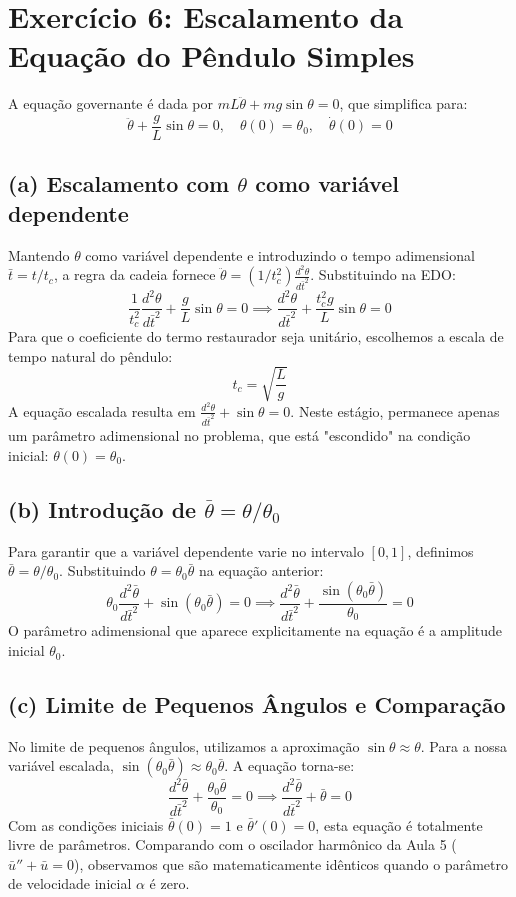 \documentclass{article}
\begin{document}
\section*{Exercício 6: Escalamento da Equação do Pêndulo Simples}

A equação governante é dada por $mL\ddot{\theta} + mg\sin\theta = 0$, que simplifica para:
\[ \ddot{\theta} + \frac{g}{L}\sin\theta = 0, \quad \theta(0) = \theta_0, \quad \dot{\theta}(0) = 0 \]

\subsection*{(a) Escalamento com $\theta$ como variável dependente}
Mantendo $\theta$ como variável dependente e introduzindo o tempo adimensional $\bar{t} = t/t_c$, a regra da cadeia fornece $\ddot{\theta} = (1/t_c^2)\frac{d^2\theta}{d\bar{t}^2}$. Substituindo na EDO:
\[ \frac{1}{t_c^2}\frac{d^2\theta}{d\bar{t}^2} + \frac{g}{L}\sin\theta = 0 \implies \frac{d^2\theta}{d\bar{t}^2} + \frac{t_c^2 g}{L}\sin\theta = 0 \]
Para que o coeficiente do termo restaurador seja unitário, escolhemos a escala de tempo natural do pêndulo:
\[ t_c = \sqrt{\frac{L}{g}} \]
A equação escalada resulta em $\frac{d^2\theta}{d\bar{t}^2} + \sin\theta = 0$. Neste estágio, permanece apenas um parâmetro adimensional no problema, que está "escondido" na condição inicial: $\theta(0) = \theta_0$.

\subsection*{(b) Introdução de $\bar{\theta} = \theta/\theta_0$}
Para garantir que a variável dependente varie no intervalo $[0, 1]$, definimos $\bar{\theta} = \theta/\theta_0$. Substituindo $\theta = \theta_0\bar{\theta}$ na equação anterior:
\[ \theta_0\frac{d^2\bar{\theta}}{d\bar{t}^2} + \sin(\theta_0\bar{\theta}) = 0 \implies \frac{d^2\bar{\theta}}{d\bar{t}^2} + \frac{\sin(\theta_0\bar{\theta})}{\theta_0} = 0 \]
O parâmetro adimensional que aparece explicitamente na equação é a amplitude inicial $\theta_0$.

\subsection*{(c) Limite de Pequenos Ângulos e Comparação}
No limite de pequenos ângulos, utilizamos a aproximação $\sin\theta \approx \theta$. Para a nossa variável escalada, $\sin(\theta_0\bar{\theta}) \approx \theta_0\bar{\theta}$. A equação torna-se:
\[ \frac{d^2\bar{\theta}}{d\bar{t}^2} + \frac{\theta_0\bar{\theta}}{\theta_0} = 0 \implies \frac{d^2\bar{\theta}}{d\bar{t}^2} + \bar{\theta} = 0 \]
Com as condições iniciais $\bar{\theta}(0) = 1$ e $\bar{\theta}'(0) = 0$, esta equação é totalmente livre de parâmetros. Comparando com o oscilador harmônico da Aula 5 ($\bar{u}'' + \bar{u} = 0$), observamos que são matematicamente idênticos quando o parâmetro de velocidade inicial $\alpha$ é zero.
\end{document}

